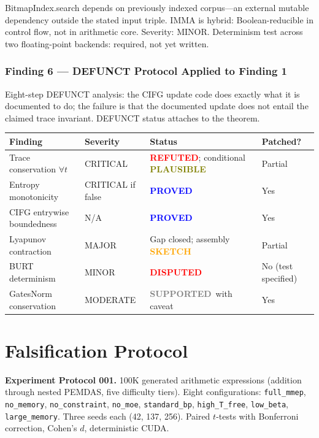 \documentclass[11pt,letterpaper]{article}
\newcommand{\PROVED}{\textbf{\textcolor{blue}{PROVED}}}
\newcommand{\SKETCH}{\textbf{\textcolor{orange}{SKETCH}}}
\newcommand{\REFUTED}{\textbf{\textcolor{red}{REFUTED}}}
\newcommand{\PLAUSIBLE}{\textbf{\textcolor{olive}{PLAUSIBLE}}}
\newcommand{\SUPPORTED}{\textbf{\textcolor{gray}{SUPPORTED}}}
\newcommand{\DISPUTED}{\textbf{\textcolor{red}{DISPUTED}}}
\begin{document}
BitmapIndex.search depends on previously indexed corpus---an external mutable
dependency outside the stated input triple.
IMMA is hybrid: Boolean-reducible in control flow, not in arithmetic core.
Severity: MINOR.  Determinism test across two floating-point backends: required,
not yet written.

\subsubsection*{Finding 6 --- DEFUNCT Protocol Applied to Finding 1}

Eight-step DEFUNCT analysis: the CIFG update code does exactly what it is
documented to do; the failure is that the documented update does not entail
the claimed trace invariant.  DEFUNCT status attaches to the theorem.

\begin{center}
\renewcommand{\arraystretch}{1.2}
\begin{tabular}{llll}
\toprule
Finding & Severity & Status & Patched? \\
\midrule
Trace conservation $\forall t$ & CRITICAL & \REFUTED; conditional \PLAUSIBLE & Partial \\
Entropy monotonicity & CRITICAL if false & \PROVED & Yes \\
CIFG entrywise boundedness & N/A & \PROVED & Yes \\
Lyapunov contraction & MAJOR & Gap closed; assembly \SKETCH & Partial \\
BURT determinism & MINOR & \DISPUTED & No (test specified) \\
GatesNorm conservation & MODERATE & \SUPPORTED\ with caveat & Yes \\
\bottomrule
\end{tabular}
\end{center}

\section{Falsification Protocol}
\label{sec:falsification}

\textbf{Experiment Protocol 001.}
100K generated arithmetic expressions (addition through nested PEMDAS, five
difficulty tiers).  Eight configurations: \texttt{full\_mmep}, \texttt{no\_memory},
\texttt{no\_constraint}, \texttt{no\_moe}, \texttt{standard\_bp},
\texttt{high\_T\_free}, \texttt{low\_beta}, \texttt{large\_memory}.
Three seeds each (42, 137, 256).  Paired $t$-tests with Bonferroni correction,
Cohen's $d$, deterministic CUDA.
\end{document}
